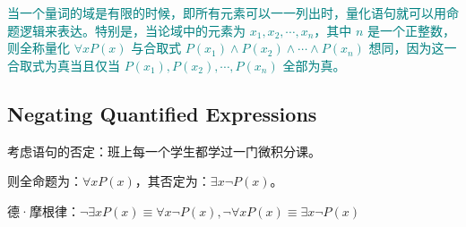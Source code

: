 \documentclass[12pt, a4paper]{article} %
\begin{document}
\textcolor{teal}{
    当一个量词的域是有限的时候，即所有元素可以一一列出时，量化语句就可以用命题逻辑来表达。特别是，当论域中的元素为 $x_1, x_2, \cdots, x_n$，其中 $n$ 是一个正整数，则全称量化 $\forall x P(x)$ 与合取式 $P(x_1) \wedge P(x_2) \wedge \cdots \wedge P(x_n)$ 想同，因为这一合取式为真当且仅当 $P(x_1), P(x_2), \cdots, P(x_n)$ 全部为真。
}

\subsection{Negating Quantified Expressions}

考虑语句的否定：班上每一个学生都学过一门微积分课。

则全命题为：$\forall x P(x)$，其否定为：$\exists x \neg P(x)$。

德·摩根律：$\neg \exists x P(x) \equiv \forall x \neg P(x), \neg \forall x P(x) \equiv \exists x \neg P(x)$
\end{document}
